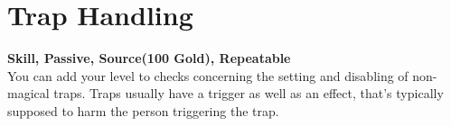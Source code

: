 \section{Trap Handling}\label{sec:trapHandling}
\textbf{Skill, Passive, Source(100 Gold), Repeatable}\\
You can add your level to checks concerning the setting and disabling of non-magical traps.
Traps usually have a trigger as well as an effect, that's typically supposed to harm the person triggering the trap.\\
